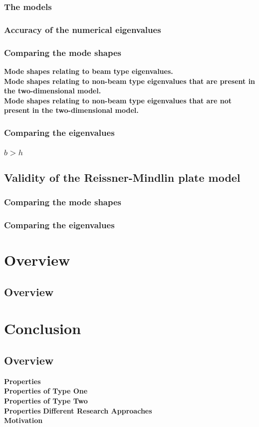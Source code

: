 \documentclass[../main.tex]{subfiles}
\begin{document}
\subsubsection{The models}
\subsubsection{Accuracy of the numerical eigenvalues}
\subsubsection{Comparing the mode shapes}
\textbf{Mode shapes relating to beam type eigenvalues.}\\
\textbf{Mode shapes relating to non-beam type eigenvalues that are present in the two-dimensional model.}\\
\textbf{Mode shapes relating to non-beam type eigenvalues that are not present in the two-dimensional model.}
\subsubsection{Comparing the eigenvalues}
\subsubsection{$b > h$}
\subsection{Validity of the Reissner-Mindlin plate model}
\subsubsection{Comparing the mode shapes}
\subsubsection{Comparing the eigenvalues}
\section{Overview}
\subsection{Overview}
\section{Conclusion}
\subsection{Overview}
\textbf{Properties}\\
\textbf{Properties of Type One}\\
\textbf{Properties of Type Two}\\
\textbf{Properties}
\textbf{Different Research Approaches}\\
\textbf{Motivation}
\end{document}
